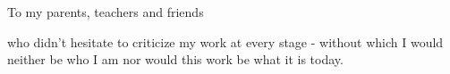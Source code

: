 %

{\Large To my parents, teachers and friends}

who didn't hesitate to criticize my work at every stage - without which I
would neither be who I am nor would this work be what it is today.
